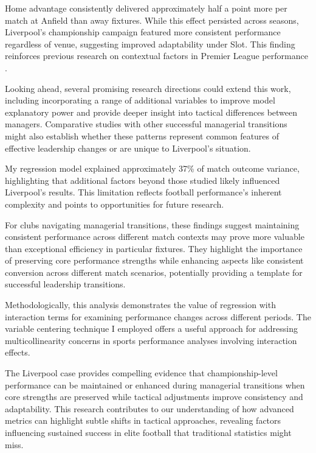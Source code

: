 \documentclass[12pt]{article}
\begin{document}
Home advantage consistently delivered approximately half a point more per match at Anfield than away fixtures. While this effect persisted across seasons, Liverpool's championship campaign featured more consistent performance regardless of venue, suggesting improved adaptability under Slot. This finding reinforces previous research on contextual factors in Premier League performance \citep{kern2012}.

Looking ahead, several promising research directions could extend this work, including incorporating a range of additional variables to improve model explanatory power and provide deeper insight into tactical differences between managers. Comparative studies with other successful managerial transitions might also establish whether these patterns represent common features of effective leadership changes or are unique to Liverpool's situation.

My regression model explained approximately 37\% of match outcome variance, highlighting that additional factors beyond those studied likely influenced Liverpool's results. This limitation reflects football performance's inherent complexity and points to opportunities for future research.

For clubs navigating managerial transitions, these findings suggest maintaining consistent performance across different match contexts may prove more valuable than exceptional efficiency in particular fixtures. They highlight the importance of preserving core performance strengths while enhancing aspects like consistent conversion across different match scenarios, potentially providing a template for successful leadership transitions.

Methodologically, this analysis demonstrates the value of regression with interaction terms for examining performance changes across different periods. The variable centering technique I employed offers a useful approach for addressing multicollinearity concerns in sports performance analyses involving interaction effects.

The Liverpool case provides compelling evidence that championship-level performance can be maintained or enhanced during managerial transitions when core strengths are preserved while tactical adjustments improve consistency and adaptability. This research contributes to our understanding of how advanced metrics can highlight subtle shifts in tactical approaches, revealing factors influencing sustained success in elite football that traditional statistics might miss.
\end{document}
